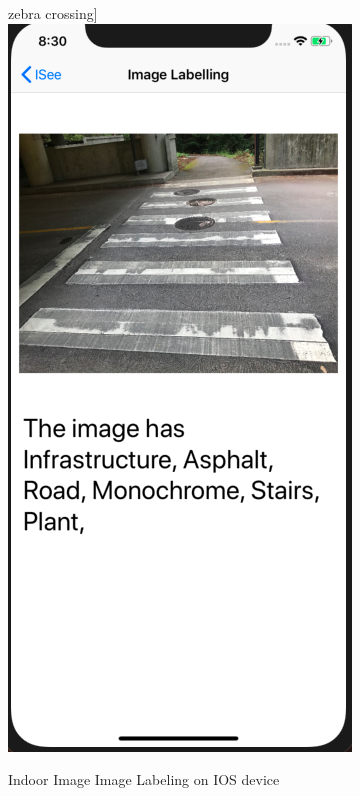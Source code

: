 \documentclass[11pt]{ucscthesis}
\begin{document}
\begin{figure}
zebra crossing]{\includegraphics{Fig/RoadImageLabelling.png}}
  \hfill
\caption{Indoor Image Image Labeling on IOS device}
\label{LabelingindoorIOS}
\end{figure}
\end{document}
